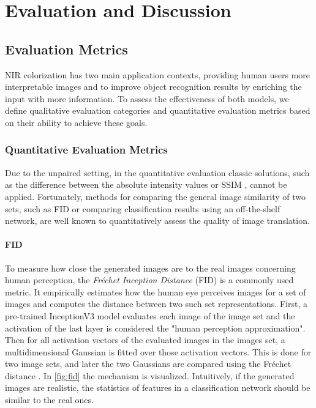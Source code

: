 \chapter{Evaluation and Discussion}
\label{chap:evaluation-and-discussion}

\section{Evaluation Metrics}

NIR colorization has two main application contexts, providing human users more interpretable images and to improve object recognition results by enriching the input with more information.
To assess the effectiveness of both models, we define qualitative evaluation categories and quantitative evaluation metrics based on their ability to achieve these goals.

\subsection{Quantitative Evaluation Metrics}
Due to the unpaired setting, in the quantitative evaluation classic solutions, such as the difference between the absolute intensity values or SSIM \parencite{ssim}, cannot be applied. Fortunately, methods for comparing the general image similarity of two sets, such as FID \parencite{ttur} or
comparing classification results using an off-the-shelf network, are well known to quantitatively assess the quality of image translation.

\subsubsection*{FID}
\label{sec:fid}
To measure how close the generated images are to the real images concerning human perception, the \textit{Fréchet Inception Distance} (FID) \parencite{ttur} is a commonly used metric.
It empirically estimates how the human eye perceives images for a set of images and computes the distance between two such set representations.
First, a pre-trained InceptionV3 model evaluates each image of the image set and the activation of the last layer is considered the "human perception approximation".
Then for all activation vectors of the evaluated images in the images set, a multidimensional Gaussian is fitted over those activation vectors.
This is done for two image sets, and later the two Gaussians are compared using the Fréchet distance \parencite{ttur}.
In \autoref{fig:fid} the mechanism is visualized.
Intuitively, if the generated images are realistic, the statistics of features in a classification network should be similar to the real ones.

